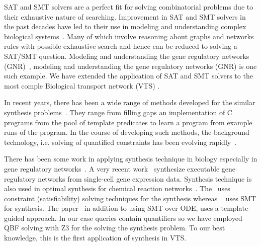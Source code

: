SAT and SMT solvers are a perfect fit for solving combinatorial problems due to their exhaustive nature of searching. 
%
Improvement in SAT and SMT solvers in the past decades have led to their use in modeling and understanding complex biological systems~\cite{heule2010exact,yordanov2013smt,mangla2010timing}. 
%
Many of which involve reasoning about graphs and networks rules with possible exhaustive search and hence can be reduced to solving a SAT/SMT question. 
%
Modeling and understanding the gene regulatory networks (GNR)~\cite{guerra2012reasoning,chin2008biographe}, modeling and understanding the gene regulatory networks (GNR) \cite{giacobbe2015model,rosenblueth2014inference, batt2010efficient, yordanov2016method, dunn2014defining, paoletti2014analyzing, koksal2013synthesis} is one such example. 
%
We have extended the application of SAT and SMT solvers to the most comple Biological transport network (VTS) \cite{mani2016stacking,shukla}. 

In recent years, there has been a wide range of methods
developed for the similar synthesis problems~\cite{sketch,sygus,exampleSynth}.
%
They range from filling gaps an implementation of C programs from the pool of template predicates to learn a program from example
runs of the program.
%
In the course of developing such methods,
the background technology, i.e. solving of quantified
constraints has been evolving rapidly~\cite{lonsing2010depqbf,z3Quant}.
%

There has been some work in
applying synthesis technique in biology especially in gene regulatory networks~\cite{shavit2016automated, fisher2015synthesising}. A very recent work~\cite{fisher2015synthesising} synthesize executable gene regulatory networks from single-cell gene expression data.
Synthesis technique is also used in optimal synthesis for chemical reaction networks~\cite{cardelli2017syntax}. The~\cite{fisher2015synthesising} uses constraint (satisfiability) solving techniques for the synthesis whereas ~\cite{shavit2016automated} uses SMT for synthesis. The paper~\cite{cardelli2017syntax} in addition to using SMT over ODE, uses a template-guided approach. In our case queries contain quantifiers so we have employed QBF solving with Z3 for the solving the synthesis problem. To our best knowledge, this is the first application of synthesis in VTS.

~        
